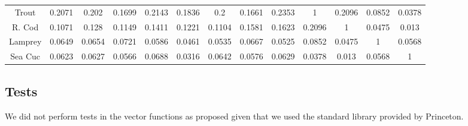 \documentclass{tufte-handout}
\begin{document}
\begin{adjustbox}{scale=0.8}
\begin{tabular}{c|c|c|c|c|c|c|c|c|c|c|c|c|}
Trout &	\num{0.2071}&	\num{0.202}&	\num{0.1699}&	\num{0.2143}&	\num{0.1836}&	\num{0.2}&	\num{0.1661}&	\num{0.2353}&	\num{1}&	\num{0.2096}&	\num{0.0852}&	\num{0.0378}\\
R. Cod &	\num{0.1071}&	\num{0.128}&	\num{0.1149}&	\num{0.1411}&	\num{0.1221}&	\num{0.1104}&	\num{0.1581}&	\num{0.1623}&	\num{0.2096}&	\num{1}&	\num{0.0475}&	\num{0.013}\\
Lamprey &	\num{0.0649}&	\num{0.0654}&	\num{0.0721}&	\num{0.0586}&	\num{0.0461}&	\num{0.0535}&	\num{0.0667}&	\num{0.0525}&	\num{0.0852}&	\num{0.0475}&	\num{1}&	\num{0.0568}\\
Sea Cuc &	\num{0.0623}&	\num{0.0627}&	\num{0.0566}&	\num{0.0688}&	\num{0.0316}&	\num{0.0642}&	\num{0.0576}&	\num{0.0629}&	\num{0.0378}&	\num{0.013}&	\num{0.0568}&	\num{1}\\


\end{tabular}
\end{adjustbox}

\subsection{Tests}
We did not perform tests in the vector functions as proposed given that we used the standard library provided by Princeton.
\end{document}
